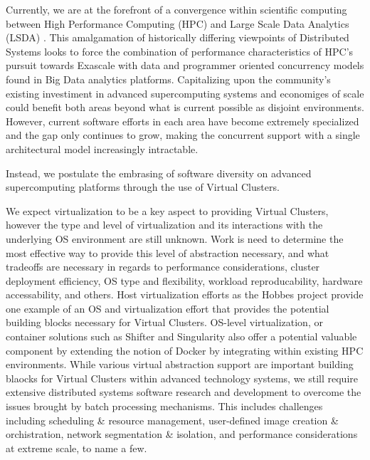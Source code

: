 Currently, we are at the forefront of a convergence within scientific computing between High Performance Computing (HPC) and Large Scale Data Analytics (LSDA) \cite{reed2015exascale, leeland2016}. This amalgamation of historically differing viewpoints of Distributed Systems looks to force the combination of performance characteristics of HPC's pursuit towards Exascale with data and programmer oriented concurrency models found in Big Data analytics platforms.  Capitalizing upon the community's existing investiment in advanced supercomputing systems and economiges of scale could benefit both areas beyond what is current possible as disjoint environments.  However, current software efforts in each area have become extremely specialized and the gap only continues to grow, making the concurrent support with a single architectural model increasingly intractable.

Instead, we postulate the embrasing of software diversity on advanced supercomputing platforms through the use of Virtual Clusters.  




We expect virtualization to be a key aspect to providing Virtual Clusters, however the type and level of virtualization and its interactions with the underlying OS environment are still unknown.  Work is need to determine the most effective way to provide this level of abstraction necessary, and what tradeoffs are necessary in regards to performance considerations, cluster deployment efficiency, OS type and flexibility, workload reproducability, hardware accessability, and others.  Host virtualization efforts as the Hobbes project \cite{hobbes} provide one example of an OS and virtualization effort that provides the potential building blocks necessary for Virtual Clusters.  OS-level virtualization, or container solutions such as Shifter and Singularity \cite{shiftercug2016, singularity} also offer a potential valuable component by extending the notion of Docker by integrating within existing HPC environments. While various  virtual abstraction support are important building blaocks for Virtual Clusters within advanced technology systems, we still require extensive distributed systems software research and development to overcome the issues brought by batch processing mechanisms. This includes challenges including scheduling \& resource management, user-defined image creation \& orchistration, network segmentation \& isolation, and performance considerations at extreme scale, to name a few.



